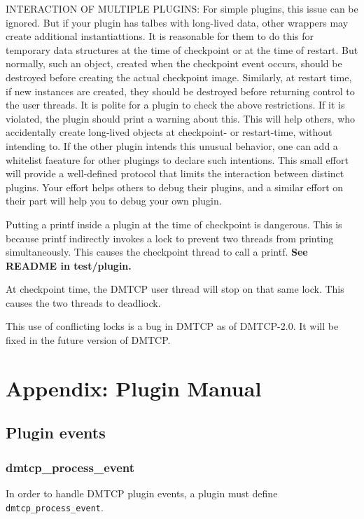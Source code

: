 \documentclass{article}
\begin{document}
INTERACTION OF MULTIPLE PLUGINS:
    For simple plugins, this issue can be ignored.  But if your plugin has
talbes with long-lived data, other wrappers may create additional instantiattions.
It is reasonable for them to do this for temporary data structures at
the time of checkpoint or at the time of restart.  But normally, such an
object, created when the checkpoint event occurs, should be destroyed before
creating the actual checkpoint image.  Similarly, at restart time, if new
instances are created, they should be destroyed before returning control
to the user threads.
    It is polite for a plugin to check the above restrictions.  If it is violated,
the plugin should print a warning about this.  This will help others, who
accidentally create long-lived objects at checkpoint- or restart-time,
without intending to.  If the other plugin intends this unusual behavior, one
can add a whitelist faeature for other plugings to declare such intentions.
    This small effort will provide a well-defined protocol that limits the
interaction between distinct plugins.  Your effort helps others to debug their
plugins, and a similar effort on their part will help you to debug your own plugin.

Putting a printf inside a plugin at the time of checkpoint is dangerous.  This
is because printf indirectly invokes a lock to prevent two threads from
printing simultaneously.  This causes the checkpoint thread to call a printf.
{\bf See README in test/plugin.}

At checkpoint time, the DMTCP user thread will stop on that same lock.  This
causes the two threads to deadliock.

This use of conflicting locks is a bug in DMTCP as of DMTCP-2.0.  It will
be fixed in the future version of DMTCP.

\appendix
\section{Appendix:  Plugin Manual}
\subsection{Plugin events}

\subsubsection{dmtcp\_process\_event}

In order to handle DMTCP plugin events, a plugin must
define {\tt dmtcp\_process\_event}.
\end{document}
